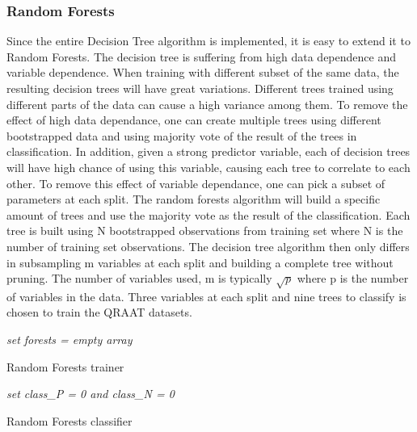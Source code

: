 \documentclass[twoside]{article}
\begin{document}
\subsubsection{Random Forests}
Since the entire Decision Tree algorithm is implemented, it is easy to extend it to Random Forests. The decision tree is suffering from high data dependence and variable dependence. When training with different subset of the same data, the resulting decision trees will have great variations. Different trees trained using different parts of the data can cause a high variance among them. To remove the effect of high data dependance, one can create multiple trees using different bootstrapped data and using majority vote of the result of the trees in classification. In addition, given a strong predictor variable, each of decision trees will have high chance of using this variable, causing each tree to correlate to each other. To remove this effect of variable dependance, one can pick a subset of parameters at each split. The random forests algorithm will build a specific amount of trees and use the majority vote as the result of the classification. Each tree is built using N bootstrapped observations from training set where N is the number of training set observations. The decision tree algorithm then only differs in subsampling m variables at each split and building a complete tree without pruning. The number of variables used, m is typically $\sqrt{p}$ where p is the number of variables in the data. Three variables at each split and nine trees to classify is chosen to train the QRAAT datasets.


\IncMargin{1em}
\begin{algorithm}
\BlankLine
\emph{set forests = empty array}\;
\caption{Random Forests trainer}\label{RFt}
\end{algorithm}\DecMargin{1em}

\IncMargin{1em}
\begin{algorithm}
\BlankLine
\emph{set class\_P = 0 and class\_N = 0}\;
\caption{Random Forests classifier}\label{RFc}
\end{algorithm}\DecMargin{1em}
\end{document}
